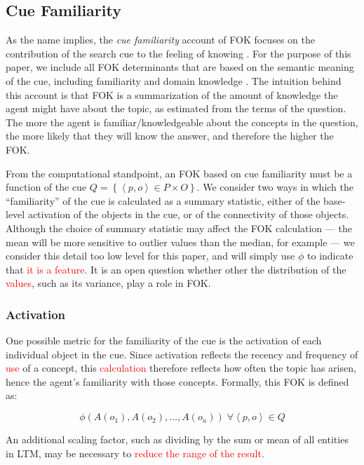 \documentclass[10pt,letterpaper]{article}
\newcommand{\fixme}[2][]{#2}
\renewcommand{\fixme}[2][]{\textcolor{red}{#2}}
\newcommand{\setof}[1]{\left \{ #1 \right \}}
\newcommand{\tuple}[1]{\left \langle #1 \right \rangle }
\begin{document}
\subsection{Cue Familiarity}

As the name implies, the \emph{cue familiarity} account of FOK focuses on the contribution of the search cue to the feeling of knowing \cite{Reder1992WhatDeterminesInitial,Metcalfe1993TheCueFamiliarity,Koriat2001TheCombinedContributions}.
For the purpose of this paper, we include all FOK determinants that are based on the semantic meaning of the cue, including familiarity and domain knowledge \cite{Schwartz1994SourcesOfInformation}.
The intuition behind this account is that FOK is a summarization of the amount of knowledge the agent might have about the topic, as estimated from the terms of the question.
The more the agent is familiar/knowledgeable about the concepts in the question, the more likely that they will know the answer, and therefore the higher the FOK.

From the computational standpoint, an FOK based on cue familiarity must be a function of the cue $Q = \setof{\tuple{p, o}{\in}P{\times}O}$.
We consider two ways in which the ``familiarity'' of the cue is calculated as a summary statistic, either of the base-level activation of the objects in the cue, or of the connectivity of those objects.
Although the choice of summary statistic may affect the FOK calculation --- the mean will be more sensitive to outlier values than the median, for example --- we consider this detail too low level for this paper, and will simply use $\phi$ to indicate that \fixme{it is a feature}.
It is an open question whether other the distribution of the \fixme{values}, such as its variance, play a role in FOK.

\subsubsection{Activation}

One possible metric for the familiarity of the cue is the activation of each individual object in the cue.
Since activation reflects the recency and frequency of \fixme{use} of a concept, this \fixme{calculation} therefore reflects how often the topic has arisen, hence the agent's familiarity with those concepts.
Formally, this FOK is defined as:

$$\phi\left(A(o_1), A(o_2), ..., A(o_n)\right) \; \forall {\tuple{p, o}{\in}Q}$$

An additional scaling factor, such as dividing by the sum or mean of all entities in LTM, may be necessary to \fixme{reduce the range of the result}.
\end{document}
